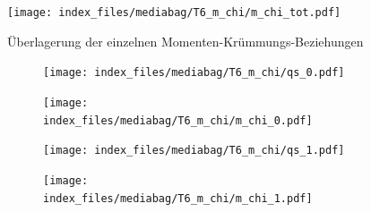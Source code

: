 \documentclass[
  11pt,
  letterpaper,
]{scrreprt}
\begin{document}
\begin{figure}[H]

{\centering \texttt{[image: index\_files/mediabag/T6\_m\_chi/m\_chi\_tot.pdf]}

}

\caption{Überlagerung der einzelnen Momenten-Krümmungs-Beziehungen}

\end{figure}%

\begin{figure}

\begin{minipage}{0.50\linewidth}

\begin{figure}[H]

{\centering \texttt{[image: index\_files/mediabag/T6\_m\_chi/qs\_0.pdf]}

}


\end{figure}%

\end{minipage}%
%
\begin{minipage}{0.50\linewidth}

\begin{figure}[H]

{\centering \texttt{[image: index\_files/mediabag/T6\_m\_chi/m\_chi\_0.pdf]}

}


\end{figure}%

\end{minipage}%

\end{figure}%

\begin{figure}

\begin{minipage}{0.50\linewidth}

\begin{figure}[H]

{\centering \texttt{[image: index\_files/mediabag/T6\_m\_chi/qs\_1.pdf]}

}


\end{figure}%

\end{minipage}%
%
\begin{minipage}{0.50\linewidth}

\begin{figure}[H]

{\centering \texttt{[image: index\_files/mediabag/T6\_m\_chi/m\_chi\_1.pdf]}

}


\end{figure}%

\end{minipage}%

\end{figure}%
\end{document}
